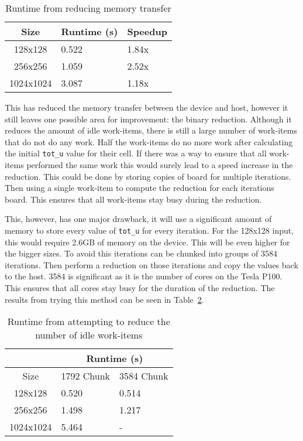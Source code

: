\begin{table}[ht]
\vspace{-5mm}
\centering
\caption{Runtime from reducing memory transfer}
\vspace{1mm}
\begin{tabular}{|c||p{5.8em}|p{4.8em}|}
    \hline
    Size & Runtime (s) & Speedup \\
    \hline
    128x128 & 0.522 & 1.84x \\
    \hline
    256x256 & 1.059 & 2.52x \\
    \hline
    1024x1024 & 3.087 & 1.18x \\
    \hline
\end{tabular}
\label{table:reduction-memory-optimisations}
\vspace{-3mm}
\end{table}

This has reduced the memory transfer between the device and host, however it still leaves one possible area for improvement: the binary reduction. Although it reduces the amount of idle work-items, there is still a large number of work-items that do not do any work. Half the work-items do no more work after calculating the initial \texttt{tot\_u} value for their cell. If there was a way to ensure that all work-items performed the same work this would surely lead to a speed increase in the reduction. This could be done by storing copies of board for multiple iterations. Then using a single work-item to compute the reduction for each iterations board. This ensures that all work-items stay busy during the reduction. 

This, however, has one major drawback, it will use a significant amount of memory to store every value of \texttt{tot\_u} for every iteration. For the 128x128 input, this would require 2.6GB of memory on the device. This will be even higher for the bigger sizes. To avoid this iterations can be chunked into groups of 3584 iterations. Then perform a reduction on those iterations and copy the values back to the host. 3584 is significant as it is the number of cores on the Tesla P100. This ensures that all cores stay busy for the duration of the reduction. The results from trying this method can be seen in Table~\ref{table:reduction-divergent-workflows}. 

\begin{table}[ht]
\vspace{-5mm}
\centering
\caption{Runtime from attempting to reduce the number of idle work-items}
\vspace{1mm}
\begin{tabular}{|c||p{3.5em}|p{3.5em}|}
    \hline
    & \multicolumn{2}{|c|}{Runtime (s)}\\
    \hline
    Size & 1792 Chunk & 3584 Chunk \\
    \hline
    128x128 & 0.520 & 0.514 \\
    \hline
    256x256 & 1.498 & 1.217 \\
    \hline
    1024x1024 & 5.464 & - \\
    \hline
\end{tabular}
\label{table:reduction-divergent-workflows}
\vspace{-3mm}
\end{table}


